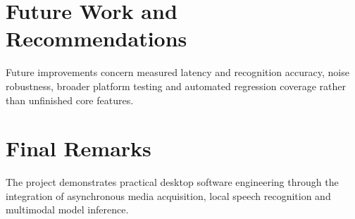 \documentclass[openany]{tietreport}
\begin{document}
\section{Future Work and Recommendations}
Future improvements concern measured latency and recognition accuracy, noise robustness, broader platform testing and automated regression coverage rather than unfinished core features.
\section{Final Remarks}
The project demonstrates practical desktop software engineering through the integration of asynchronous media acquisition, local speech recognition and multimodal model inference.
\printbibliography[heading=bibintoc]
\end{document}
